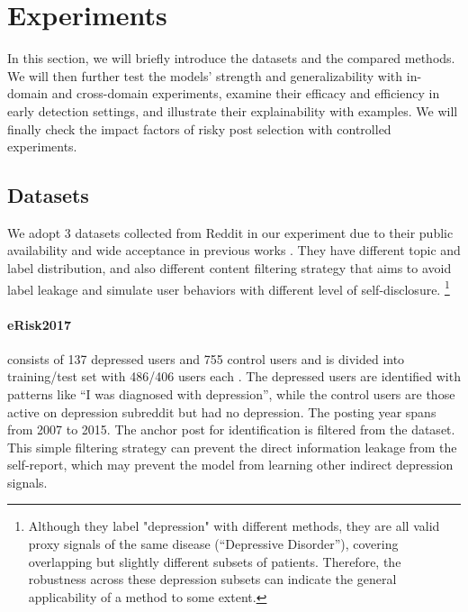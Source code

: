 \section{Experiments}

In this section, we will briefly introduce the datasets and the compared methods. We will then further test the models' strength and generalizability with in-domain and cross-domain experiments, examine their efficacy and efficiency in early detection settings, and illustrate their explainability with examples. We will finally check the impact factors of risky post selection with controlled experiments.

\subsection{Datasets}

We adopt 3 datasets collected from Reddit in our experiment due to their public availability and wide acceptance in previous works \citep{losada2017erisk, trotzek2018utilizing, harrigian2020models}. They have different topic and label distribution, and also different content filtering strategy that aims to avoid label leakage and simulate user behaviors with different level of self-disclosure. \footnote{Although they label "depression" with different methods, they are all valid proxy signals of the same disease (``Depressive Disorder''), covering overlapping but slightly different subsets of patients. Therefore, the robustness across these depression subsets can indicate the general applicability of a method to some extent.}

\paragraph{eRisk2017} consists of 137 depressed users and 755 control users and is divided into training/test set with 486/406 users each \citep{losada2016test}. The depressed users are identified with patterns like ``I was diagnosed with depression'', while the control users are those active on depression subreddit but had no depression. The posting year spans from 2007 to 2015. The anchor post for identification is filtered from the dataset. This simple filtering strategy can prevent the direct information leakage from the self-report, which may prevent the model from learning other indirect depression signals.

